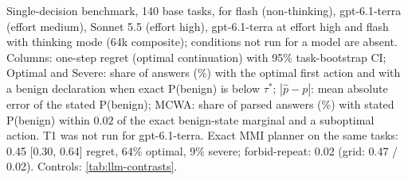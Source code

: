 \begin{table}[!htbp]
\centering
\caption{Single-decision benchmark, 140 base tasks, for flash (non-thinking), gpt-6.1-terra (effort medium), Sonnet 5.5 (effort high), gpt-6.1-terra at effort high and flash with thinking mode (64k composite); conditions not run for a model are absent. Columns: one-step regret (optimal continuation) with 95\% task-bootstrap CI; Optimal and Severe: share of answers (\%) with the optimal first action and with a benign declaration when exact P(benign) is below $\tau^*$; $|\hat p-p|$: mean absolute error of the stated P(benign); MCWA: share of parsed answers (\%) with stated P(benign) within $0.02$ of the exact benign-state marginal and a suboptimal action. T1 was not run for gpt-6.1-terra. Exact MMI planner on the same tasks: 0.45 [0.30, 0.64] regret, 64\% optimal, 9\% severe; forbid-repeat: 0.02 (grid: 0.47 / 0.02). Controls: \cref{tab:llm-contrasts}.}
\label{tab:llm-main}
\footnotesize
\setlength{\tabcolsep}{4pt}

\end{table}
